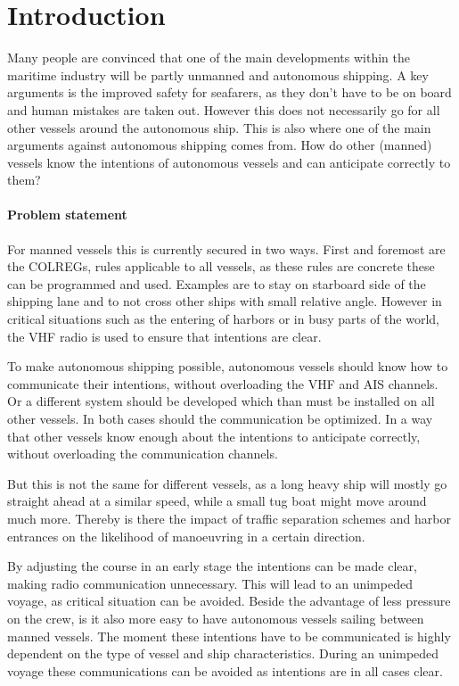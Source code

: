 \chapter*{Introduction}
\label{sec:introduction}

Many people are convinced that one of the main developments within the maritime industry will be partly unmanned and autonomous shipping. A key arguments is the improved safety for seafarers, as they don't have to be on board and human mistakes are taken out. However this does not necessarily go for all other vessels around the autonomous ship. This is also where one of the main arguments against autonomous shipping comes from. How do other (manned) vessels know the intentions of autonomous vessels and can anticipate correctly to them?

\subsubsection*{Problem statement}
For manned vessels this is currently secured in two ways. First and foremost are the COLREGs, rules applicable to all vessels, as these rules are concrete these can be programmed and used. Examples are to stay on starboard side of the shipping lane and to not cross other ships with small relative angle. However in critical situations such as the entering of harbors or in busy parts of the world, the VHF radio is used to ensure that intentions are clear.

To make autonomous shipping possible, autonomous vessels should know how to communicate their intentions, without overloading the VHF and AIS channels. Or a different system should be developed which than must be installed on all other vessels. In both cases should the communication be optimized. In a way that other vessels know enough about the intentions to anticipate correctly, without overloading the communication channels.

But this is not the same for different vessels, as a long heavy ship will mostly go straight ahead at a similar speed, while a small tug boat might move around much more. Thereby is there the impact of traffic separation schemes and harbor entrances on the likelihood of manoeuvring in a certain direction. 

By adjusting the course in an early stage the intentions can be made clear, making radio communication unnecessary. This will lead to an unimpeded voyage, as critical situation can be avoided. Beside the advantage of less pressure on the crew, is it also more easy to have autonomous vessels sailing between manned vessels.
The moment these intentions have to be communicated is highly dependent on the type of vessel and ship characteristics. During an unimpeded voyage these communications can be avoided as intentions are in all cases clear.

